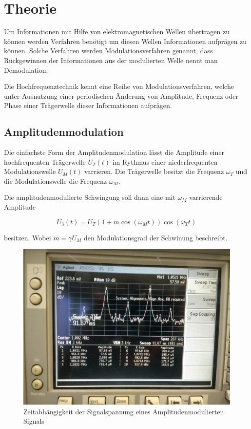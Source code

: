 \section{Theorie}
Um Informationen mit Hilfe von elektromagnetischen Wellen übertragen zu können werden Verfahren benötigt um diesen Wellen
Informationen aufprägen zu können. Solche Verfahren werden Modulationsverfahren genannt, dass Rückgewinnen der Informationen aus der 
modulierten Welle nennt man Demodulation.

Die Hochfrequenztechnik kennt eine Reihe von Modulationsverfahren, welche unter Ausnutzung einer periodischen Änderung von 
Amplitude, Frequenz oder Phase einer Trägerwelle dieser Informationen aufprägen.

\subsection{Amplitudenmodulation}
Die einfachste Form der Amplitudenmodulation lässt die Amplitude einer hochfrequenten Trägerwelle $U_T(t)$ im Rythmus einer niederfrequenten Modulationswelle $U_M(t)$ varrieren. Die Trägerwelle besitzt die Frequenz $\omega_T$ und die Modulationswelle die
Frequenz $\omega_M$.

Die amplitudenmodulierte Schwingung soll dann eine mit $\omega_M$ varrierende Amplitude

\begin{equation}
U_{3}(t) = U_T (1 + m \cos( \omega_M t))\cos(\omega_T t)
\end{equation} 

besitzen. Wobei $m = \gamma U_M$ den  Modulationsgrad der Schwinung beschreibt.

\begin{figure}
	\centering
	\includegraphics[width=\textwidth]{img/Aufgabenteil_b.jpg}
	\caption{Zeitabhängigkeit der Signalspannung eines Amplitudenmodulierten Signals}
\end{figure}

